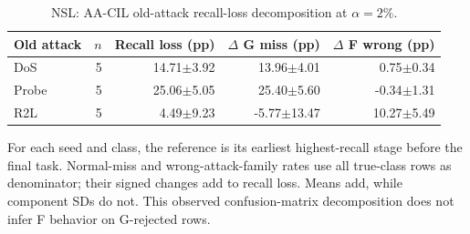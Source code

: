 \begin{table}[t]
\centering\scriptsize
\setlength{\tabcolsep}{3.3pt}
\caption{NSL: AA-CIL old-attack recall-loss decomposition at $\alpha=2\%$.}\label{tab:forgetting-decomposition-nsl_kdd}
\begin{tabular}{lrrrr}
\toprule
Old attack & $n$ & Recall loss (pp) & $\Delta$ G miss (pp) & $\Delta$ F wrong (pp) \\
\midrule
DoS & 5 & 14.71$\pm$3.92 & 13.96$\pm$4.01 & 0.75$\pm$0.34 \\
Probe & 5 & 25.06$\pm$5.05 & 25.40$\pm$5.60 & -0.34$\pm$1.31 \\
R2L & 5 & 4.49$\pm$9.23 & -5.77$\pm$13.47 & 10.27$\pm$5.49 \\
\bottomrule
\end{tabular}
\par\smallskip\begin{minipage}{0.98\textwidth}\scriptsize For each seed and class, the reference is its earliest highest-recall stage before the final task. Normal-miss and wrong-attack-family rates use all true-class rows as denominator; their signed changes add to recall loss. Means add, while component SDs do not. This observed confusion-matrix decomposition does not infer F behavior on G-rejected rows.\end{minipage}
\end{table}

